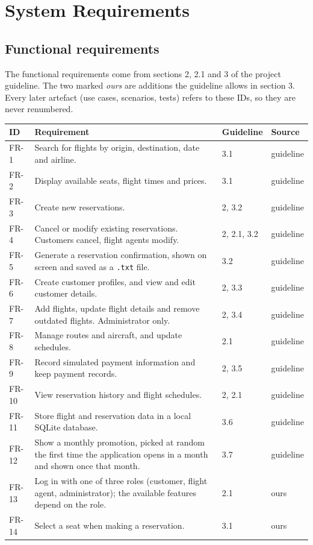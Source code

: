 \section*{System Requirements}

\subsection*{Functional requirements}

The functional requirements come from sections 2, 2.1 and 3 of the project
guideline. The two marked \emph{ours} are additions the guideline allows in
section 3. Every later artefact (use cases, scenarios, tests) refers to these
IDs, so they are never renumbered.

\begin{longtable}{@{}p{1.3cm}>{\raggedright\arraybackslash}p{8.6cm}p{2.3cm}p{1.8cm}@{}}
\toprule
\textbf{ID} & \textbf{Requirement} & \textbf{Guideline} & \textbf{Source}\\
\midrule
\endhead
FR-1 & Search for flights by origin, destination, date and airline. & 3.1 & guideline\\
FR-2 & Display available seats, flight times and prices. & 3.1 & guideline\\
FR-3 & Create new reservations. & 2, 3.2 & guideline\\
FR-4 & Cancel or modify existing reservations. Customers cancel, flight agents modify. & 2, 2.1, 3.2 & guideline\\
FR-5 & Generate a reservation confirmation, shown on screen and saved as a \texttt{.txt} file. & 3.2 & guideline\\
FR-6 & Create customer profiles, and view and edit customer details. & 2, 3.3 & guideline\\
FR-7 & Add flights, update flight details and remove outdated flights. Administrator only. & 2, 3.4 & guideline\\
FR-8 & Manage routes and aircraft, and update schedules. & 2.1 & guideline\\
FR-9 & Record simulated payment information and keep payment records. & 2, 3.5 & guideline\\
FR-10 & View reservation history and flight schedules. & 2, 2.1 & guideline\\
FR-11 & Store flight and reservation data in a local SQLite database. & 3.6 & guideline\\
FR-12 & Show a monthly promotion, picked at random the first time the application opens in a month and shown once that month. & 3.7 & guideline\\
FR-13 & Log in with one of three roles (customer, flight agent, administrator); the available features depend on the role. & 2.1 & ours\\
FR-14 & Select a seat when making a reservation. & 3.1 & ours\\
\bottomrule
\end{longtable}

